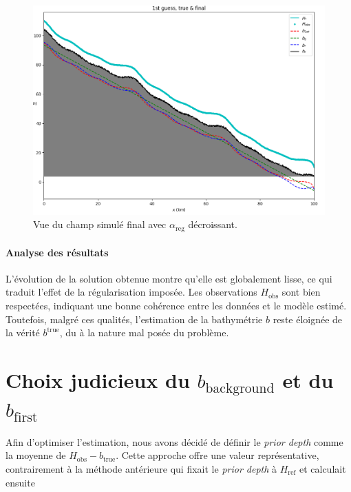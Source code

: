 \documentclass{article}
\begin{document}
\begin{figure}[H]
    \vspace{0.5cm}
    
    \begin{minipage}[b]{0.7\linewidth}
        \centering
        \includegraphics[width=\linewidth]{Images_Ayoub/With_Regularisation/Gradient/View.png}
        \caption{Vue du champ simulé final avec \(\alpha_{\text{reg}}\) décroissant.}
        \label{fig:dec-view}
    \end{minipage}
\end{figure}

\paragraph{Analyse des résultats}
L'évolution de la solution obtenue montre qu'elle est globalement lisse, ce qui traduit l'effet de la régularisation imposée. Les observations \( H_{\text{obs}} \) sont bien respectées, indiquant une bonne cohérence entre les données et le modèle estimé. Toutefois, malgré ces qualités, l'estimation de la bathymétrie \( b \) reste éloignée de la vérité \( b^{\text{true}} \), du à la nature mal posée du problème.


\section{Choix judicieux du \(b_{\text{background}}\) et du \(b_{\text{first}}\)}




Afin d'optimiser l'estimation, nous avons décidé de définir le \emph{prior depth} comme la moyenne de \(H_{\text{obs}} - b_{\text{true}}\). Cette approche offre une valeur représentative, contrairement à la méthode antérieure qui fixait le \emph{prior depth} à \(H_{\text{ref}}\) et calculait ensuite
\end{document}

